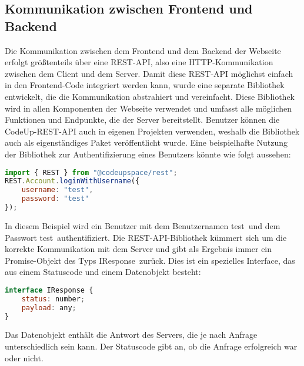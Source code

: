 \documentclass[main.tex]{subfiles}
\begin{document}
    \subsection{Kommunikation zwischen Frontend und Backend}\label{subsec:web_srv_communication}
    Die Kommunikation zwischen dem Frontend und dem Backend der Webseite erfolgt größtenteils über eine REST-API, also eine HTTP-Kommunikation zwischen dem Client und dem Server.
    Damit diese REST-API möglichst einfach in den Frontend-Code integriert werden kann, wurde eine separate Bibliothek entwickelt, die die Kommunikation abstrahiert und vereinfacht.
    Diese Bibliothek wird in allen Komponenten der Webseite verwendet und umfasst alle möglichen Funktionen und Endpunkte, die der Server bereitstellt.
    Benutzer können die CodeUp-REST-API auch in eigenen Projekten verwenden, weshalb die Bibliothek auch als eigenständiges Paket veröffentlicht wurde.
    Eine beispielhafte Nutzung der Bibliothek zur Authentifizierung eines Benutzers könnte wie folgt aussehen:
    \begin{lstlisting}[language=javascript]
import { REST } from "@codeupspace/rest";
REST.Account.loginWithUsername({
    username: "test",
    password: "test"
});
    \end{lstlisting}
    In diesem Beispiel wird ein Benutzer mit dem Benutzernamen \dq test\dq \ und dem Passwort \dq test\dq \ authentifiziert.
    Die REST-API-Bibliothek kümmert sich um die korrekte Kommunikation mit dem Server und gibt als Ergebnis immer ein Promise-Objekt des Typs \dq IResponse\dq\ zurück.
    Dies ist ein spezielles Interface, das aus einem Statuscode und einem Datenobjekt besteht:
    \begin{lstlisting}[language=javascript]
interface IResponse {
    status: number;
    payload: any;
}
    \end{lstlisting}
    Das Datenobjekt enthält die Antwort des Servers, die je nach Anfrage unterschiedlich sein kann.
    Der Statuscode gibt an, ob die Anfrage erfolgreich war oder nicht.
\end{document}
